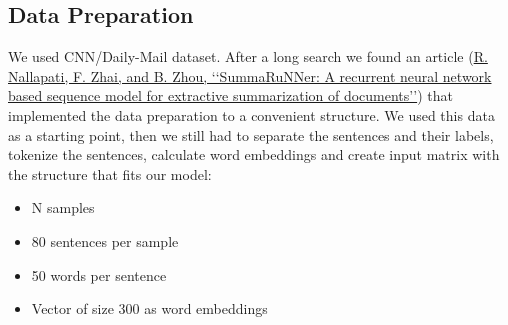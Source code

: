 \documentclass{article}
\begin{document}
\subsection{Data Preparation}
We used CNN/Daily-Mail dataset. After a long search we found an article (\href{https://arxiv.org/pdf/1611.04230.pdf}{R. Nallapati, F. Zhai, and B. Zhou, ‘‘SummaRuNNer: A recurrent neural network based sequence model for extractive summarization of documents’’}) that implemented the data preparation to a convenient structure. We used this data as a starting point, then we still had to separate the sentences and their labels, tokenize the sentences, calculate word embeddings and create input matrix with the structure that fits our model:
\begin{itemize}
    \item N samples
    \item 80 sentences per sample
    \item 50 words per sentence
    \item Vector of size 300 as word embeddings
\end{itemize}
\end{document}
